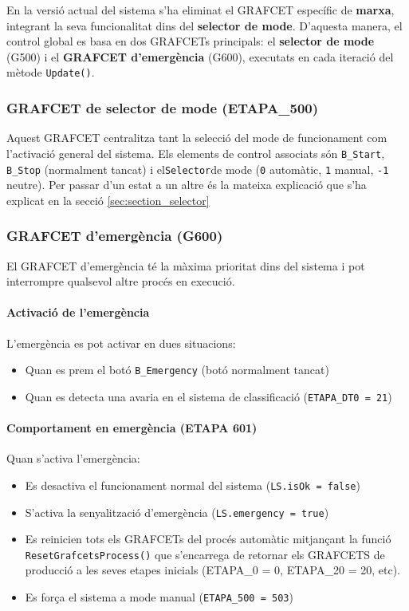 \documentclass[a4paper,11pt,DIV=13,headings=normal,abstract=true,twoside=semi]{article}
\begin{document}
En la versió actual del sistema s'ha eliminat el GRAFCET específic de \textbf{marxa}, integrant la seva funcionalitat dins del \textbf{selector de mode}. D'aquesta manera, el control global es basa en dos GRAFCETs principals: el \textbf{selector de mode} (G500) i el \textbf{GRAFCET d'emergència} (G600), executats en cada iteració del mètode \texttt{Update()}.

\subsubsection*{GRAFCET de selector de mode (ETAPA\_500)}

Aquest GRAFCET centralitza tant la selecció del mode de funcionament com l'activació general del sistema. Els elements de control associats són \texttt{B\_Start}, \texttt{B\_Stop} (normalment tancat) i el\texttt{Selector}de mode (\texttt{0} automàtic, \texttt{1} manual, \texttt{-1} neutre). Per passar d'un estat a un altre és la mateixa explicació que s'ha explicat en la secció \ref{sec:section_selector}

\subsubsection*{GRAFCET d'emergència (G600)}

El GRAFCET d'emergència té la màxima prioritat dins del sistema i pot interrompre qualsevol altre procés en execució.

\paragraph{Activació de l'emergència}

L'emergència es pot activar en dues situacions:
\begin{itemize}
\item Quan es prem el botó \texttt{B\_Emergency} (botó normalment tancat)
\item Quan es detecta una avaria en el sistema de classificació (\texttt{ETAPA\_DT0 = 21})
\end{itemize}

\paragraph{Comportament en emergència (ETAPA 601)}

Quan s'activa l'emergència:
\begin{itemize}
\item Es desactiva el funcionament normal del sistema (\texttt{LS.isOk = false})
\item S'activa la senyalització d'emergència (\texttt{LS.emergency = true})
\item Es reinicien tots els GRAFCETs del procés automàtic mitjançant la funció \texttt{ResetGrafcetsProcess()} que s'encarrega de retornar els GRAFCETS de producció a les seves etapes inicials (ETAPA\_0 = 0, ETAPA\_20 = 20, etc).
\item Es força el sistema a mode manual (\texttt{ETAPA\_500 = 503})
\end{itemize}
\end{document}
